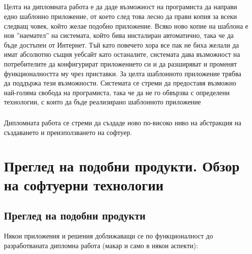 \documentclass[pdftex,14pt,a4paper]{extreport}
\begin{document}
\paragraph {} Целта на дипломната работа е да даде възможност на програмиста да направи едно шаблонно приложение, от което след това лесно да прави копия за всеки следващ човек, който желае подобно приложение. Всяко ново копие на шаблона е нов ''наемател'' на системата, който бива инсталиран автоматично, така че да бъде достъпен от Интернет. Тъй като повечето хора все пак не биха желали да имат абсолютно същия уебсайт като останалите, системата дава възможност на потребителите да конфигурират приложението си и да разширяват и променят функционалността му чрез приставки. За целта шаблонното приложение трябва да поддържа тези възможности. Системата се стреми да предоставя възможно най-голяма свобода на програмиста, така че да не го обвързва с определени технологии, с които да бъде реализирано шаблонното приложение
\paragraph {} Дипломната работа се стреми да създаде ново по-високо ниво на абстракция на създаването и преизползването на софтуер.
\chapter {Преглед на подобни продукти. Обзор на софтуерни технологии}
\section {Преглед на подобни продукти}
Някои приложения и решения доближаващи се по функционалност до разработваната дипломна работа (макар и само в някои аспекти):
\end{document}
